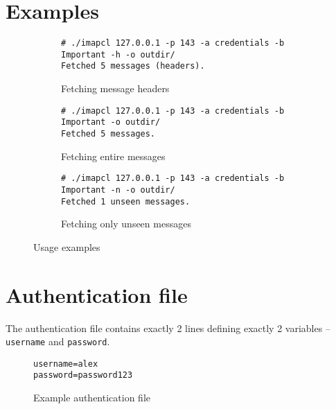 \documentclass[a4]{report}
\begin{document}
\section{Examples}

\begin{figure}[h!]
\begin{subfigure}{\textwidth}
\begin{mdframed}[backgroundcolor=lightgray]
\begin{verbatim}
# ./imapcl 127.0.0.1 -p 143 -a credentials -b Important -h -o outdir/
Fetched 5 messages (headers).
\end{verbatim}
\end{mdframed}
\caption{Fetching message headers}
\end{subfigure}
\vspace{0.5cm}

\begin{subfigure}{\textwidth}
\begin{mdframed}[backgroundcolor=lightgray]
\begin{verbatim}
# ./imapcl 127.0.0.1 -p 143 -a credentials -b Important -o outdir/
Fetched 5 messages.
\end{verbatim}
\end{mdframed}
\caption{Fetching entire messages}
\end{subfigure}
\vspace{0.5cm}

\begin{subfigure}{\textwidth}
\begin{mdframed}[backgroundcolor=lightgray]
\begin{verbatim}
# ./imapcl 127.0.0.1 -p 143 -a credentials -b Important -n -o outdir/
Fetched 1 unseen messages.
\end{verbatim}
\end{mdframed}
\caption{Fetching only unseen messages}
\end{subfigure}
\caption{Usage examples}
\end{figure}

\section{Authentication file}

The authentication file contains exactly 2 lines defining exactly 2 variables -- \texttt{username} and \texttt{password}.

\begin{figure}[h]
\begin{verbatim}
username=alex
password=password123
\end{verbatim}
\caption{Example authentication file}
\end{figure}
\end{document}
